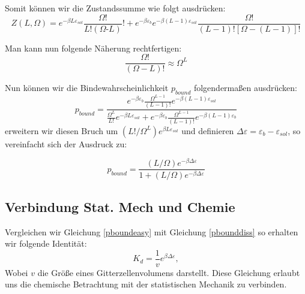 \documentclass[bachelor,       %
               twoside,        %
               BCOR10mm,       %
               english,ngerman, %
               ]{GAUBM}
\begin{document}
Somit können wir die Zustandssumme wie folgt ausdrücken:
\begin{equation}
Z(L,\Omega) = e^{-\beta L\varepsilon_{sol}}\frac{\Omega!}{L!(\Omega\text{-}L)}! + e^{-\beta\varepsilon_b}e^{-\beta(L-1)\varepsilon_{sol}} \frac{\Omega!}{(L-1)![\Omega-(L-1)]!}
\end{equation}

Man kann nun folgende Näherung rechtfertigen:\cite{phybio}
\begin{equation}
\frac{\Omega!}{(\Omega-L)!} \approx \Omega^L
\end{equation}

Nun können wir die Bindewahrscheinlichkeit $p_{bound}$ folgendermaßen ausdrücken:
\begin{equation}
p_{bound} = \frac{e^{-\beta\varepsilon_b}\frac{\Omega^{L-1}}{(L-1)!}e^{-\beta(L-1)\varepsilon_{sol}}}{\frac{\Omega^L}{L!}e^{-\beta L\varepsilon_{sol}} + e^{-\beta\varepsilon_b}\frac{\Omega^{L-1}}{(L-1)!}e^{-\beta(L-1)\varepsilon_b}}
\end{equation}
erweitern wir diesen Bruch um $(L!/\Omega^L)e^{\beta L\varepsilon_{sol}}$ und definieren
$\Delta\varepsilon = \varepsilon_b -\varepsilon_{sol}$, so vereinfacht sich der Ausdruck zu:

\begin{equation}
\label{pboundeasy}
p_{bound} = \frac{(L/\Omega)e^{-\beta\Delta\varepsilon}}{1+(L/\Omega)e^{-\beta\Delta\varepsilon}}
\end{equation}
\subsection{Verbindung Stat. Mech und Chemie}
Vergleichen wir Gleichung \ref{pboundeasy} mit Gleichung \ref{pbounddiss} so erhalten wir folgende Identität:
\begin{equation}
\label{mechchem}
K_d = \frac{1}{v}e^{\beta\Delta\varepsilon},
\end{equation}
Wobei $v$ die Größe eines Gitterzellenvolumens darstellt.
Diese Gleichung erlaubt uns die chemische Betrachtung mit der statistischen Mechanik zu verbinden.
\end{document}
